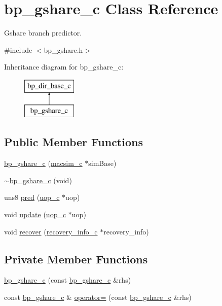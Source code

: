 \hypertarget{classbp__gshare__c}{
\section{bp\_\-gshare\_\-c Class Reference}
\label{classbp__gshare__c}
}


Gshare branch predictor.  




{\ttfamily \#include $<$bp\_\-gshare.h$>$}

Inheritance diagram for bp\_\-gshare\_\-c:\begin{figure}[H]
\begin{center}
\leavevmode
\includegraphics[height=2.000000cm]{classbp__gshare__c}
\end{center}
\end{figure}
\subsection*{Public Member Functions}
\begin{DoxyCompactItemize}
\item 
\hyperlink{classbp__gshare__c_ab4cda4c326dda86ff4724bb77561a4a5}{bp\_\-gshare\_\-c} (\hyperlink{classmacsim__c}{macsim\_\-c} $\ast$simBase)
\item 
\hyperlink{classbp__gshare__c_a75b2b0bc2ca50a7216d8e06884c499ce}{$\sim$bp\_\-gshare\_\-c} (void)
\item 
uns8 \hyperlink{classbp__gshare__c_a692880676e5f5a6039832c07a2b5e206}{pred} (\hyperlink{classuop__c}{uop\_\-c} $\ast$uop)
\item 
void \hyperlink{classbp__gshare__c_a7f4c0fb922d3640acd10477ff806b91e}{update} (\hyperlink{classuop__c}{uop\_\-c} $\ast$uop)
\item 
void \hyperlink{classbp__gshare__c_aa7345e7c9919f2e75bafb7f85e34f6f0}{recover} (\hyperlink{classrecovery__info__c}{recovery\_\-info\_\-c} $\ast$recovery\_\-info)
\end{DoxyCompactItemize}
\subsection*{Private Member Functions}
\begin{DoxyCompactItemize}
\item 
\hyperlink{classbp__gshare__c_a3346112628e7f02012040181964c482d}{bp\_\-gshare\_\-c} (const \hyperlink{classbp__gshare__c}{bp\_\-gshare\_\-c} \&rhs)
\item 
const \hyperlink{classbp__gshare__c}{bp\_\-gshare\_\-c} \& \hyperlink{classbp__gshare__c_aa8a28e878a8f95386cc166bf4e18c980}{operator=} (const \hyperlink{classbp__gshare__c}{bp\_\-gshare\_\-c} \&rhs)
\end{DoxyCompactItemize}


